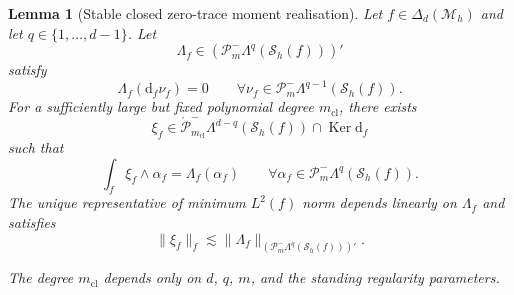 \documentclass[a4paper,11pt]{article}
\newtheorem{lemma}[theorem]{Lemma}
\theoremstyle{definition}
\newcommand{\DIFF}{\mathrm{d}}
\newcommand{\Mh}{\mathcal{M}_h}
\newcommand{\Sh}{\mathcal{S}_h}
\newcommand{\FM}[1]{\Delta_{#1}}
\newcommand{\PLtrim}[2]{\mathcal{P}_{#1}^{-}\Lambda^{#2}}
\newcommand{\Ker}{\operatorname{Ker}}
\newcommand{\PLtrimz}[2]{\mathring{\mathcal P}_{#1}^{-}\Lambda^{#2}}
\begin{document}
\begin{lemma}[Stable closed zero-trace moment realisation]
\label{lem:stable.closed.moment.realisation}
Let $f\in\FM{d}(\Mh)$ and let $q\in\{1,\ldots,d-1\}$.
Let
\[
  \Lambda_f
  \in
  \left(
    \PLtrim{m}{q}(\Sh(f))
  \right)'
\]
satisfy
\begin{equation}\label{eq:closed.moment.absolute.compatibility}
  \Lambda_f(\DIFF_f\nu_f)=0
  \qquad
  \forall
  \nu_f\in
  \PLtrim{m}{q-1}(\Sh(f)).
\end{equation}
For a sufficiently large but fixed polynomial degree $m_{\mathrm{cl}}$, there exists
\[
  \xi_f
  \in
  \PLtrimz{m_{\mathrm{cl}}}{d-q}(\Sh(f))
  \cap
  \Ker\DIFF_f
\]
such that
\begin{equation}\label{eq:closed.moment.zero.trace.realisation}
  \int_f
  \xi_f\wedge\alpha_f
  =
  \Lambda_f(\alpha_f)
  \qquad
  \forall
  \alpha_f\in
  \PLtrim{m}{q}(\Sh(f)).
\end{equation}
The unique representative of minimum $L^2(f)$ norm depends linearly on $\Lambda_f$ and satisfies
\[
  \|\xi_f\|_f
  \lesssim
  \|\Lambda_f\|_{
    \left(
      \PLtrim{m}{q}(\Sh(f))
    \right)'
  }.
\]

The degree $m_{\mathrm{cl}}$ depends only on $d$, $q$, $m$, and the standing regularity parameters.
\end{lemma}
\end{document}

